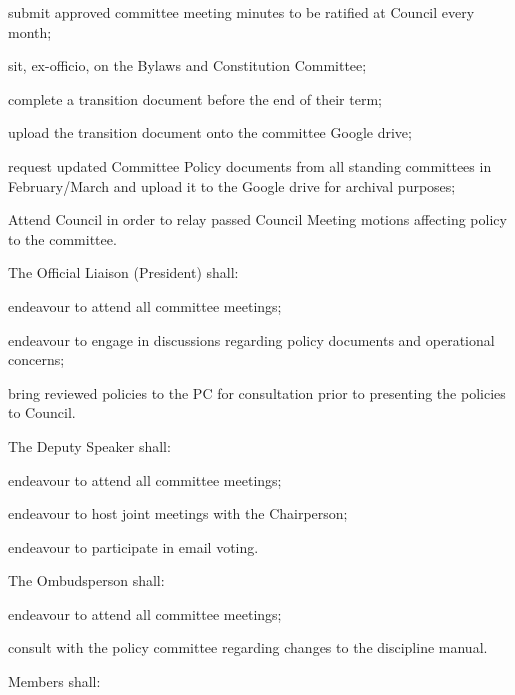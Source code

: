 \begin{longenum}[ label*=\thesubsection.\arabic*., align=left]
\begin{longenum}[label*=\arabic*., align=left]
\begin{longenum}[label*=\arabic*., align=left]
\begin{longenum}[label*=\arabic*., align=left]
			\item submit approved committee meeting minutes to be ratified at Council every month;
			\item sit, ex-officio, on the Bylaws and Constitution Committee;
			\item complete a transition document before the end of their term;
			\item upload the transition document onto the committee Google drive;
			\item request updated Committee Policy documents from all standing committees in February/March and upload it to the Google drive for archival purposes;
			\item Attend Council in order to relay passed Council Meeting motions affecting policy to the committee.
			\end{longenum}
		\item The Official Liaison (President) shall:
			\begin{longenum}[label*=\arabic*., align=left]		
			\item endeavour to attend all committee meetings;
			\item endeavour to engage in discussions regarding policy documents and operational concerns;
			\item bring reviewed policies to the PC for consultation prior to presenting the policies to Council.		
			\end{longenum}		
		\item The Deputy Speaker shall:
			\begin{longenum}[label*=\arabic*., align=left]	
			\item endeavour to attend all committee meetings;
			\item endeavour to host joint meetings with the Chairperson;
			\item endeavour to participate in email voting.
			\end{longenum}
		\item The Ombudsperson shall: 
			\begin{longenum}[label*=\arabic*., align=left]			
			\item endeavour to attend all committee meetings;
			\item consult with the policy committee regarding changes to the discipline manual.
			\end{longenum}				
		\item Members shall: 			
			\begin{longenum}[label*=\arabic*., align=left]						

\end{longenum}
\end{longenum}
\end{longenum}
\end{longenum}
